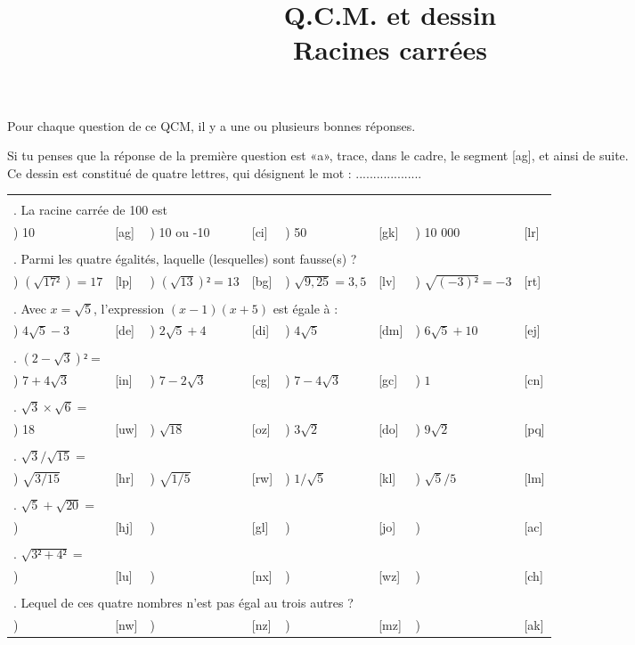 \documentclass[première-activité-correction.tex]{subfiles}
\title{{\huge Q.C.M. et dessin}\\ Racines carrées}
\author{}
\date{}
\newcounter{QCMQuestionCounter}
\newcounter{QCMReponseCounter}
\newcommand{\QCMQuestion}[1]{
	& & & & & & & \\
	\multicolumn{8}{l}{\arabic{QCMQuestionCounter}. #1}\stepcounter{QCMQuestionCounter} \\
}
\newcommand{\QCMReponse}[8]{
	\setcounter{QCMReponseCounter}{1}         \alph{QCMReponseCounter}) #1 & [#2] & \stepcounter{QCMReponseCounter}           \alph{QCMReponseCounter}) #3 & [#4] & \stepcounter{QCMReponseCounter}           \alph{QCMReponseCounter}) #5 & [#6] & \stepcounter{QCMReponseCounter}           \alph{QCMReponseCounter}) #7 & [#8] \\
}
\begin{document}
\maketitle

\begin{minipage}{0.5\linewidth}
	Pour chaque question de ce QCM, il y a une ou plusieurs bonnes réponses.

	Si tu penses que la réponse de la première question est «a», trace, dans le cadre, le segment [ag], et ainsi de suite. \\

	Ce dessin est constitué de quatre lettres, qui désignent le mot : ...................
\end{minipage}
\hspace{0.08\linewidth}
\begin{minipage}{0.4\linewidth}
	\newcommand{\placePoint}[2]{
		#1 * \linewidth / 4.8 - \linewidth / 8, \linewidth - #2 * \linewidth / 4.8 + \linewidth / 8
	}

\end{minipage}

\begin{tabular}{llllllll}
	\QCMQuestion{La racine carrée de 100 est}
	\QCMReponse{10}{ag}{10 ou -10}{ci}{50}{gk}{10 000}{lr}
	\QCMQuestion{Parmi les quatre égalités, laquelle (lesquelles) sont fausse(s) ?}
	\QCMReponse{$(\sqrt{17²}) = 17$}{lp}{$(\sqrt{13})² = 13$}{bg}{$\sqrt{9,25} = 3,5$}{lv}{$\sqrt{(-3)²} = -3$}{rt}
	\QCMQuestion{Avec $x=\sqrt{5}$, l'expression $(x-1)(x+5)$ est égale à :}
	\QCMReponse{$4\sqrt{5} - 3$}{de}{$2\sqrt{5} + 4$}{di}{$4\sqrt{5}$}{dm}{$6\sqrt{5} + 10$}{ej}
	\QCMQuestion{$(2 - \sqrt{3})² =$}
	\QCMReponse{$7+4\sqrt{3}$}{in}{$7-2\sqrt{3}$}{cg}{$7-4\sqrt{3}$}{gc}{$1$}{cn}
	\QCMQuestion{$\sqrt{3}×\sqrt{6} =$}
	\QCMReponse{18}{uw}{$\sqrt{18}$}{oz}{$3\sqrt{2}$}{do}{$9\sqrt{2}$}{pq}
	\QCMQuestion{$\sqrt{3}/\sqrt{15} =$}
	\QCMReponse{$\sqrt{3/15}$}{hr}{$\sqrt{1/5}$}{rw}{$1/\sqrt{5}$}{kl}{$\sqrt{5}/5$}{lm}
	\QCMQuestion{$\sqrt{5}+\sqrt{20} =$}
	\QCMReponse{}{hj}{}{gl}{}{jo}{}{ac}
	\QCMQuestion{$\sqrt{3² + 4²} =$}
	\QCMReponse{}{lu}{}{nx}{}{wz}{}{ch}
	\QCMQuestion{Lequel de ces quatre nombres n'est pas égal au trois autres ?}
	\QCMReponse{}{nw}{}{nz}{}{mz}{}{ak}
\end{tabular}
\end{document}
